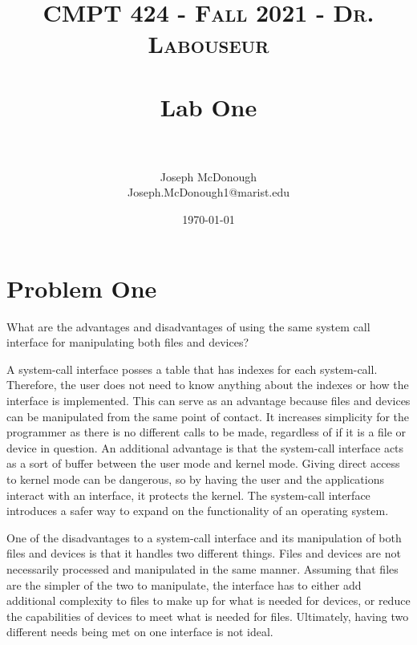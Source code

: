 \documentclass[letterpaper, 10pt,DIV=13]{scrartcl}
\title{	
   \normalfont \normalsize 
   \textsc{CMPT 424 - Fall 2021 - Dr. Labouseur} \\[10pt] %
   \horrule{0.5pt} \\[0.25cm] 	%
   \huge Lab One  \\     	    %
   \horrule{0.5pt} \\[0.25cm] 	%
}
\author{Joseph McDonough \\ \normalsize Joseph.McDonough1@marist.edu}
\date{\normalsize\today} 	%
\numberwithin{equation}{section} %
\numberwithin{figure}{section} %
\numberwithin{table}{section} %
\begin{document}
\maketitle %

\section{Problem One}

What are the advantages and disadvantages of using the same system call interface for manipulating both files and devices?

A system-call interface posses a table that has indexes for each system-call. Therefore, the user does not need to know anything about the indexes or how the interface is implemented. This can serve as an advantage because files and devices can be manipulated from the same point of contact. It increases simplicity for the programmer as there is no different calls to be made, regardless of if it is a file or device in question. An additional advantage is that the system-call interface acts as a sort of buffer between the user mode and kernel mode. Giving direct access to kernel mode can be dangerous, so by having the user and the applications interact with an interface, it protects the kernel. The system-call interface introduces a safer way to expand on the functionality of an operating system.

One of the disadvantages to a system-call interface and its manipulation of both files and devices is that it handles two different things. Files and devices are not necessarily processed and manipulated in the same manner. Assuming that files are the simpler of the two to manipulate, the interface has to either add additional complexity to files to make up for what is needed for devices, or reduce the capabilities of devices to meet what is needed for files. Ultimately, having two different needs being met on one interface is not ideal.


\pagebreak

\end{document}
